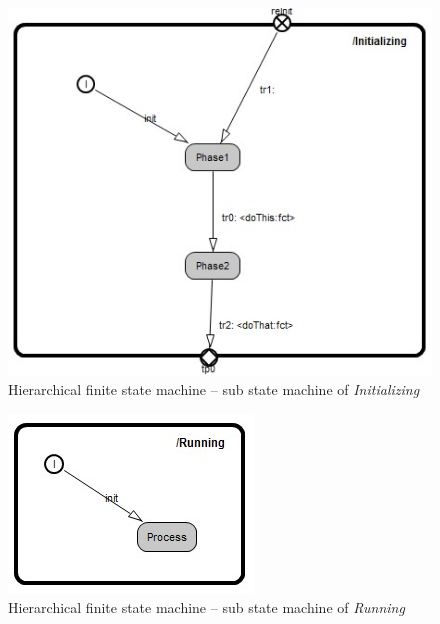 \begin{figure}
\includegraphics[scale=0.7]{images/040-HierarchicalFSMInitializing.jpg}
\caption{Hierarchical finite state machine -- sub state machine of \emph{Initializing}}
\end{figure}

\begin{figure}
\includegraphics[scale=0.7]{images/040-HierarchicalFSMRunning.jpg}
\caption{Hierarchical finite state machine -- sub state machine of \emph{Running}}
\end{figure}
